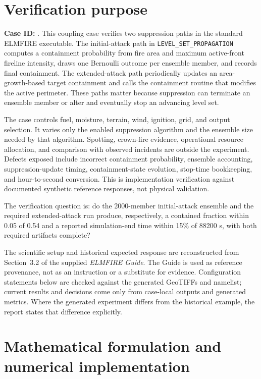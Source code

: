 \section{Verification purpose}

\textbf{Case ID:} \texttt{\CaseID}. This coupling case verifies two suppression paths in the standard ELMFIRE executable. The initial-attack path in \texttt{LEVEL\_SET\_PROPAGATION} computes a containment probability from fire area and maximum active-front fireline intensity, draws one Bernoulli outcome per ensemble member, and records final containment. The extended-attack path periodically updates an area-growth-based target containment and calls the containment routine that modifies the active perimeter. These paths matter because suppression can terminate an ensemble member or alter and eventually stop an advancing level set.

The case controls fuel, moisture, terrain, wind, ignition, grid, and output selection. It varies only the enabled suppression algorithm and the ensemble size needed by that algorithm. Spotting, crown-fire evidence, operational resource allocation, and comparison with observed incidents are outside the experiment. Defects exposed include incorrect containment probability, ensemble accounting, suppression-update timing, containment-state evolution, stop-time bookkeeping, and hour-to-second conversion. This is implementation verification against documented synthetic reference responses, not physical validation.

The verification question is: do the 2000-member initial-attack ensemble and the required extended-attack run produce, respectively, a contained fraction within 0.05 of 0.54 and a reported simulation-end time within 15\% of 88200 s, with both required artifacts complete?

The scientific setup and historical expected response are reconstructed from Section~3.2 of the supplied \emph{ELMFIRE Guide}. The Guide is used as reference provenance, not as an instruction or a substitute for evidence. Configuration statements below are checked against the generated GeoTIFFs and namelist; current results and decisions come only from case-local outputs and generated metrics. Where the generated experiment differs from the historical example, the report states that difference explicitly.

\section{Mathematical formulation and numerical implementation}


